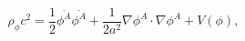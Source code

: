 \begin{equation}
\rho _\phi c^2=\frac{1}{2}\stackrel{.}{\phi ^A}\stackrel{.}{\phi
^A}+\frac{1}{ 2a^2}\nabla \phi ^A\cdot \nabla \phi ^A+V(\phi ),
\label{ed0}
\end{equation}

